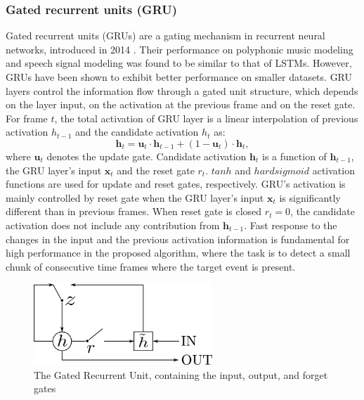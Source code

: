 \subsubsection{Gated recurrent units (GRU)} Gated recurrent units (GRUs) are a gating mechanism in recurrent neural networks, introduced in 2014 \cite{chung2014empirical}. Their performance on polyphonic music modeling and speech signal modeling was found to be similar to that of LSTMs. However, GRUs have been shown to exhibit better performance on smaller datasets. 
GRU layers control the information flow through a gated unit structure, which depends on the layer input, on the activation at the previous frame and on the reset gate.
For frame $t$, the total activation of GRU layer is a linear interpolation of previous activation $h_{t-1}$ and the candidate activation $h_t$ as:
\begin{equation}
\boldsymbol{h}_t  = \boldsymbol{u}_t  \cdot \boldsymbol{h}_{t-1}  + (1 - \boldsymbol{u}_t ) \cdot \boldsymbol{h}_t ,
\end{equation}
where $\boldsymbol{u}_t$ denotes the update gate. 
Candidate activation $\boldsymbol{h}_t$ is a function of $ \boldsymbol{h}_{t-1}$, the GRU layer’s input  $\boldsymbol{x}_{t}$ and the reset gate ${r}_{t}$. $tanh$ and $hard sigmoid$ activation functions are used for update and reset gates, respectively.
GRU's activation is mainly controlled by reset gate when the GRU layer’s input $\boldsymbol{x}_{t}$ is significantly different than in previous frames. When reset gate is closed $r_{t} = 0$, the candidate activation does not include any contribution from $\boldsymbol{h}_{t-1}$. 
Fast response to the changes in the input and the previous activation information is fundamental for high performance in the proposed algorithm, where the task is to detect a small chunk of consecutive time frames where the target event is present. 

\begin{figure}[h]
	\centering
	\includegraphics[width=0.6\textwidth]{img/GRU.png}
	\caption[GRU]{The Gated Recurrent Unit, containing the input, output, and forget gates}
	\label{fig:GRU}
\end{figure}


